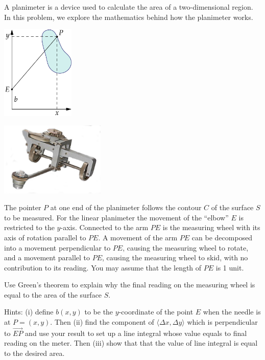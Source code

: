 \documentclass[prettycode,shellescape]{watsonbook}
\begin{document}
\begin{aexercise} 
  A planimeter is a device used to calculate the area of a
  two-dimensional region. In this problem, we explore the mathematics
  behind how the planimeter works. 

  \begin{center}
    \begin{minipage}{5cm}
      \includegraphics[width=3.5cm]{exercisefigures/planimeter.pdf}
    \end{minipage} \quad 
    \begin{minipage}{5cm}
      \includegraphics[width=5cm]{exercisefigures/myplanimeter.png}
    \end{minipage}
  \end{center}

  The pointer $P$ at one end of the planimeter follows the contour $C$
  of the surface $S$ to be measured. For the linear planimeter the
  movement of the ``elbow'' $E$ is restricted to the
  $y$-axis. Connected to the arm $PE$ is the measuring wheel with its
  axis of rotation parallel to $PE$. A movement of the arm $PE$ can be
  decomposed into a movement perpendicular to $PE$, causing the
  measuring wheel to rotate, and a movement parallel to $PE$, causing
  the measuring wheel to skid, with no contribution to its
  reading. You may assume that the length of $PE$ is 1 unit.

  Use Green's theorem to explain why the final reading on the
  measuring wheel is equal to the area of the surface $S$.

  Hints: (i) define $b(x,y)$ to be the $y$-coordinate of the point $E$
  when the needle is at $P = (x,y)$. Then (ii) find the component of
  $\langle \Delta x, \Delta y\rangle$ which is perpendicular to
  $\overrightarrow{EP}$ and use your result to set up a line integral
  whose value equals to final reading on the meter. Then (iii) show
  that that the value of line integral is equal to the desired
  area.
\end{aexercise}
\end{document}
